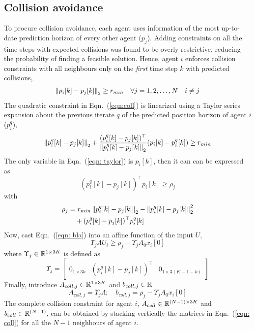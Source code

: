\subsection{Collision avoidance}
To procure collision avoidance, each agent uses information of the most up-to-date prediction horizon of every other agent ($p_j$). Adding constraints on all the time steps with expected collisions was found to be overly restrictive, reducing the probability of finding a feasible solution. Hence, agent $i$ enforces collision constraints with all neighbours only on the \textit{first} time step $k$ with predicted collisions,
\begin{equation}
\label{eqn:coll}
\left\Vert p_i[k]-p_j[k]\right\Vert_2 \geq r_{min} \quad \forall j = 1,2,\ldots,N \quad i \neq j
\end{equation}	
The quadratic constraint in Eqn.~(\ref{eqn:coll}) is linearized using a Taylor series expansion about the previous iterate $q$ of the predicted position horizon of agent $i$ ($p_i^q$),
\begin{equation}
\label{eqn: taylor}
\left\Vert p^q_i[k] - p_j[k]\right\Vert_2 + \frac{(p_i^q[k]-p_j[k])^\top}{\left\Vert p^q_i[k] - p_j[k]\right\Vert_2}(p_i[k]-p_i^q[k]) \geq r_{min}
\end{equation}
The only variable in Eqn.~(\ref{eqn: taylor}) is $p_i[k]$, then it can can be expressed as
\begin{equation}
\label{eqn: bla}
(p_i^q[k]-p_j[k])^\top p_i[k] \geq \rho_j
\end{equation}
with
\begin{equation}
\begin{aligned}
\rho_j &= r_{min}\left\Vert p^q_i[k] - p_j[k]\right\Vert_2 - \left\Vert p^q_i[k] - p_j[k]\right\Vert_2^2 \\
& \hspace{1em}+ (p_i^q[k]-p_j[k])^\top p^q_i[k]
\end{aligned}
\end{equation}
Now, cast Eqn.~(\ref{eqn: bla}) into an affine function of the input $U$,
\begin{equation}
\Upsilon_j \Lambda U_i \geq \rho_j - \Upsilon_j A_0 x_i[0]
\end{equation}
where $\Upsilon_j \in {\mathbb R}^{1 \times 3K}$ is defined as
\begin{equation}
\Upsilon_j = \begin{bmatrix}
0_{1\times 3k} & (p_i^q[k]-p_j[k])^\top & 0_{1 \times 3(K-1-k)}
\end{bmatrix}
\end{equation}
Finally, introduce $A_{coll,j} \in {\mathbb R}^{1 \times 3K}$ and $b_{coll,j} \in {\mathbb R}$
\begin{equation}
\label{eqn: coll}
A_{coll,j} = \Upsilon_j \Lambda ; \quad b_{coll,j} = \rho_j - \Upsilon_j A_0 x_i[0]
\end{equation}
The complete collision constraint for agent $i$, $A_{coll} \in {\mathbb R}^{(N-1) \times 3K}$ and $b_{coll} \in {\mathbb R}^{(N-1)}$, can be obtained by stacking vertically the matrices in Eqn.~(\ref{eqn: coll}) for all the $N-1$ neighbours of agent $i$.


